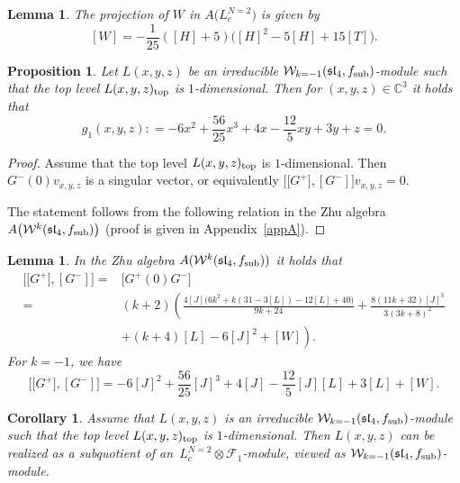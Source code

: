 \documentclass[pdftex]{sigma}
\numberwithin{equation}{section}
\newcommand{\F}{\mathcal F}
\newtheorem{Corollary}[Theorem]{Corollary}
\newtheorem{Lemma}[Theorem]{Lemma}
\newtheorem{Proposition}[Theorem]{Proposition}
\begin{document}
\begin{Lemma}\label{lemma5.3} The projection of $W$ in $A\bigl(L_c^{N=2}\bigr)$ is given by
\[
[W] = -\frac{1}{25} ([H]+5) \bigl([H]^2-5 [H]+15[T]\bigr).
\]
 \end{Lemma}






 \begin{Proposition}\label{dim1-mod}
	Let $L(x,y,z)$ be an irreducible $\mathcal{W}_{k=-1}(\mathfrak{sl}_4, f_{\rm sub})$-module such that the top level $L(x,y,z)_{\text{\rm top}}$ is $1$-dimensional. Then for $(x,y,z) \in \mathbb{C}^3$ it holds that
\[
 g_1(x,y,z): = -6 x^2 + \frac{56}{25}x^3 + 4x - \frac{12}{5}xy + 3y + z = 0.
 \]
\end{Proposition}


\begin{proof}
Assume that the top level $L(x,y,z)_{\text{\rm top}}$ is $1$-dimensional. Then $G^-(0)v_{x,y,z}$ is a singular vector, or equivalently $\bigl[\bigl[G^+\bigr], [G^-]\bigr]v_{x,y,z} = 0$.

The statement follows from the following relation in the Zhu algebra $A\bigl(\mathcal{W}^{k}(\mathfrak{sl}_4, f_{\rm sub})\bigr)$ (proof is given in Appendix~\ref{appA}).
	\end{proof}

\begin{Lemma} %
		In the Zhu algebra $A(\mathcal{W}^{k}(\mathfrak{sl}_4, f_{\rm sub}))$ it holds that
	\begin{align*}
		\bigl[\bigl[G^+\bigr], [G^-]\bigr] ={}&\bigl[G^+(0)G^-\bigr] \\
={}& (k+2) \left(\frac{4 [J] \bigl(6 k^2+k (31-3 [L])-12[L]+40\bigr)}{9 k+24}+\frac{8 (11 k+32) [J] ^3}{3 (3 k+8)^2}\right.\\
&\left.+(k+4)[L]-6 [J] ^2+[W]\right).
	\end{align*}
For $k=-1$, we have
\begin{equation} \label{G^+G-}
\bigl[\bigl[G^+\bigr], [G^-]\bigr]= -6 [J] ^2 + \frac{56}{25}[J] ^3 + 4[J] - \frac{12}{5}[J] [L] + 3[L] + [W].
\end{equation}
\end{Lemma}



\begin{Corollary} \label{crit-1_dim}
 Assume that $L(x,y,z)$ is an irreducible $\mathcal{W}_{k=-1}(\mathfrak{sl}_4, f_{\rm sub})$-module such that the top level $L(x,y,z)_{\text{\rm top}}$ is $1$-dimensional.
 Then $L(x,y,z)$ can be realized as a subquotient of an~${L^{N=2}_c \otimes \F_{1}}$-module, viewed as $\mathcal{W}_{k=-1}(\mathfrak{sl}_4, f_{\rm sub})$-module.
\end{Corollary}
\end{document}
